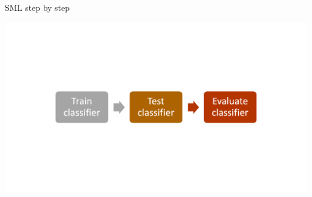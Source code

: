 \documentclass[handout]{beamer}
\begin{document}
\begin{frame}{SML step by step}
	
	\begin{center}
		\includegraphics[width=\linewidth,height=\textheight,keepaspectratio]{../pictures/MLprocess.png} \\\
	\end{center}
	
	
	
	
	
	
	
	
\end{frame}
\end{document}
